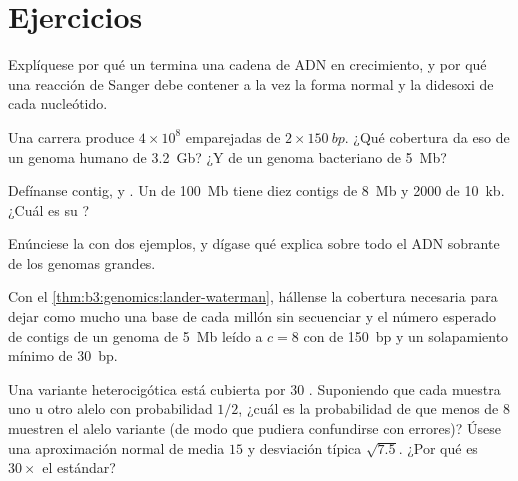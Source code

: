 \section{Ejercicios}

\begin{exercise}[$\star$]\label{exo:b3:genomics:1}
Explíquese por qué un  termina una cadena de ADN en
crecimiento, y por qué una reacción de Sanger debe contener a la vez la
forma normal y la didesoxi de cada nucleótido.
\end{exercise}

\begin{exercise}[$\star$]\label{exo:b3:genomics:2}
Una carrera produce $4\times 10^{8}$  emparejadas de
$2\times \qty{150}{bp}$. ¿Qué cobertura da eso de un genoma humano de
\qty{3.2}{Gb}? ¿Y de un genoma bacteriano de \qty{5}{Mb}?
\end{exercise}

\begin{exercise}[$\star$]\label{exo:b3:genomics:3}
Defínanse contig,  y . Un  de \qty{100}{Mb} tiene
diez contigs de \qty{8}{Mb} y \num{2000} de \qty{10}{kb}. ¿Cuál es su
?
\end{exercise}

\begin{exercise}[$\star$]\label{exo:b3:genomics:4}
Enúnciese la  con dos ejemplos, y dígase qué explica
sobre todo el ADN sobrante de los genomas grandes.
\end{exercise}

\begin{exercise}[$\star\star$]\label{exo:b3:genomics:5}
Con el \cref{thm:b3:genomics:lander-waterman}, hállense la cobertura
necesaria para dejar como mucho una base de cada millón sin secuenciar y
el número esperado de contigs de un genoma de \qty{5}{Mb} leído a $c = 8$
con  de \qty{150}{bp} y un solapamiento mínimo de \qty{30}{bp}.
\end{exercise}

\begin{exercise}[$\star\star$]\label{exo:b3:genomics:6}
Una variante heterocigótica está cubierta por $30$ . Suponiendo
que cada  muestra uno u otro alelo con probabilidad $1/2$, ¿cuál
es la probabilidad de que menos de $8$  muestren el alelo
variante (de modo que pudiera confundirse con errores)? Úsese una
aproximación normal de media $15$ y desviación típica $\sqrt{7.5}$. ¿Por
qué es $30\times$ el estándar?
\end{exercise}

